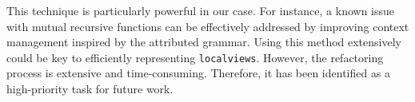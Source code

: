 This technique is particularly powerful in our case. 
For instance, a known issue with  
mutual recursive functions can be effectively addressed by improving  
context management inspired by the attributed grammar.
Using this method extensively could be key to  
efficiently representing \texttt{localviews}. 
However, the refactoring process is extensive and time-consuming.  
Therefore, it has been identified as a high-priority task for future work.  

